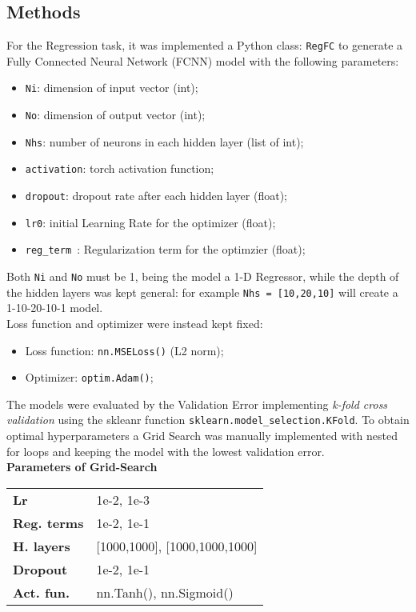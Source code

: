 \documentclass[11pt,a4paper,twocolumn]{IEEEtran}
\newcommand{\thinsepline}{\noindent\makebox[\linewidth]{\rule{7.5cm}{0.02pt}}}
\begin{document}
			\subsection{\textbf{Methods}}
			For the Regression task, it was implemented a Python class: \texttt{RegFC} to generate a Fully Connected Neural Network (FCNN) model with the following parameters:
			\begin{itemize}
				\item \texttt{Ni}: dimension of input vector (int);
				\item \texttt{No}: dimension of output vector (int);
				\item \texttt{Nhs}: number of neurons in each hidden layer (list of int);
				\item \texttt{activation}: torch activation function;
				\item \texttt{dropout}: dropout rate after each hidden layer (float);
				\item \texttt{lr0}: initial Learning Rate for the optimizer (float);
				\item \texttt{reg\_term }: Regularization term for the optimzier (float);
			\end{itemize}
			Both \texttt{Ni} and \texttt{No} must be 1, being the model a 1-D Regressor, while the depth of the hidden layers was kept general: for example \texttt{Nhs = [10,20,10]} will create a 1-10-20-10-1 model.\medskip\\
			Loss function and optimizer were instead kept fixed:
			\begin{itemize}
				\item Loss function: \texttt{nn.MSELoss()} (L2 norm);
				\item Optimizer: \texttt{optim.Adam()};
			\end{itemize}
			The models were evaluated by the Validation Error implementing \textit{k-fold cross validation} using the skleanr function \texttt{sklearn.model\_selection.KFold}.
			To obtain optimal hyperparameters a Grid Search was manually implemented with nested for loops and keeping the model with the lowest validation error.
			\thinsepline\\
			\textbf{Parameters of Grid-Search}\medskip\\
			\begin{tabular}{ll}
			\textbf{Lr}	& 1e-2, 1e-3 \\
			\textbf{Reg. terms}	& 1e-2, 1e-1 \\
			\textbf{H. layers} & [1000,1000], [1000,1000,1000] \\
			\textbf{Dropout} & 1e-2, 1e-1 \\
			\textbf{Act. fun.} & nn.Tanh(), nn.Sigmoid()
			\end{tabular}
			\thinsepline
\end{document}

